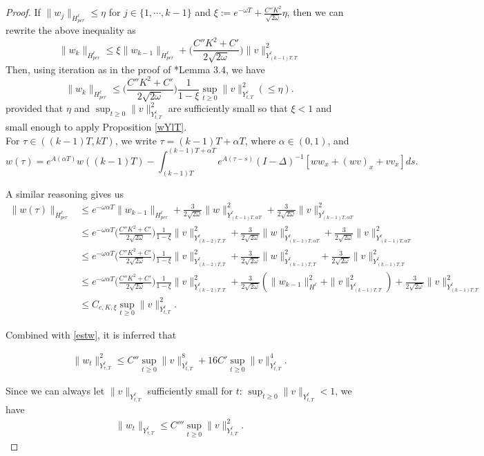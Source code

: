 \documentclass[10pt,a4paper,final]{article}
\numberwithin{equation}{section}
\newcommand{\Ga}{\alpha}
\newcommand{\Go}{\omega}
\begin{document}
\begin{proof}
If $\|w_{j}\|_{H^{\ell}_{per}}\leq \eta$ for $j\in \{1, \cdots,k-1\}$ and $\xi:=e^{-\omega T}+\frac{C''K^2}{\sqrt{2\Go}}\eta$, then we can rewrite the above inequality as 
$$\|w_{k}\|_{H^{\ell}_{per}}\leq \xi \|w_{k-1}\|_{H^{\ell}_{per}}+\bigg(\frac{C''K^2+C'}{2\sqrt{2\Go}}\bigg)\|v\|_{Y^{\ell}_{(k-1)T,T}}^2$$
Then, using iteration as in the proof of \cite{WZ}*{Lemma 3.4}, we have 
$$\|w_k\|_{H^{\ell}_{per}}\leq\bigg(\frac{C''K^2+C'}{2\sqrt{2\Go}}\bigg)\frac{1}{1-\xi}\sup_{t\geq 0}\|v\|_{Y^{\ell}_{t,T}}^2(\leq \eta).$$
provided that $\eta$ and $\sup_{t\geq 0}\|v\|_{Y^{\ell}_{t,T}}^2$ are sufficiently small so that $\xi<1$ and small enough to apply Proposition \ref{wYlT}.\\

For $\tau\in((k-1)T,kT)$, we write $\tau=(k-1)T+\Ga T$, where $\Ga\in(0,1)$, and
$$w(\tau)=e^{A(\Ga T)}w((k-1)T)-\int_{(k-1)T}^{(k-1)T+\Ga T}e^{A(\tau-s)}(I-\Delta)^{-1}[ww_x+(wv)_x+vv_x]ds.$$

A similar reasoning gives us 
\begin{align*}
    \|w(\tau)\|_{H^{\ell}_{per}}&\leq e^{-\omega \Ga T}\|w_{k-1}\|_{H^{\ell}_{per}}+\frac{3}{2\sqrt{2\Go}}\|w\|_{Y^{\ell}_{(k-1)T,\Ga T}}^2+\frac{3}{2\sqrt{2\Go}}\|v\|_{Y^{\ell}_{(k-1)T,\Ga T}}^2\\
    &\leq e^{-\omega \Ga T}\bigg(\frac{C''K^2+C'}{2\sqrt{2\Go}}\bigg)\frac{1}{1-\xi}\|v\|_{Y^{\ell}_{(k-2)T,T}}^2+\frac{3}{2\sqrt{2\Go}}\|w\|_{Y^{\ell}_{(k-1)T,\Ga T}}^2+\frac{3}{2\sqrt{2\Go}}\|v\|_{Y^{\ell}_{(k-1)T,\Ga T}}^2 \\
    &\leq e^{-\omega \Ga T}\bigg(\frac{C''K^2+C'}{2\sqrt{2\Go}}\bigg)\frac{1}{1-\xi}\|v\|_{Y^{\ell}_{(k-2)T,T}}^2+\frac{3}{2\sqrt{2\Go}}\|w\|_{Y^{\ell}_{(k-1)T,T}}^2+\frac{3}{2\sqrt{2\Go}}\|v\|_{Y^{\ell}_{(k-1)T,T}}^2 \\
    &\leq e^{-\omega \Ga T}\bigg(\frac{C''K^2+C'}{2\sqrt{2\Go}}\bigg)\frac{1}{1-\xi}\|v\|_{Y^{\ell}_{(k-2)T,T}}^2+\frac{3}{2\sqrt{2\Go}}(\|w_{k-1}\|^2_{H^{\ell}}+\|v\|_{Y^{\ell}_{(k-1)T,T}}^2)+\frac{3}{2\sqrt{2\Go}}\|v\|_{Y^{\ell}_{(k-1)T,T}}^2 \\
        &\leq C_{c,K,\xi}\sup_{t\geq 0}\|v\|_{Y^{\ell}_{t,T}}^2.
\end{align*}

 Combined with \eqref{estw}, it is inferred that 
 
\begin{align*}
    \|w_t\|_{Y^{\ell}_{\tau,T}}^2\leq C''\sup_{t\geq 0}\|v\|_{Y^{\ell}_{t,T}}^8+16C'\sup_{t\geq 0}\|v\|_{Y^{\ell}_{t,T}}^4.
\end{align*}

Since we can always let $\|v\|_{Y^{\ell}_{t,T}}$ sufficiently small for $t$: $\sup_{t\geq 0}\|v\|_{Y^{\ell}_{t,T}}<1$, we have \begin{align*}
    \|w_t\|_{Y^{\ell}_{\tau,T}}\leq C'''\sup_{t\geq 0}\|v\|_{Y^{\ell}_{t,T}}^2.
\end{align*}
\end{proof}
\end{document}
